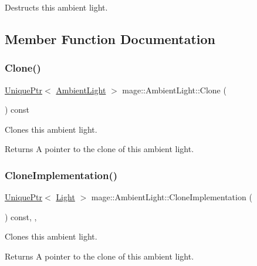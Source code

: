 Destructs this ambient light. 

\subsection{Member Function Documentation}
\hypertarget{classmage_1_1_ambient_light_a542a68882bc0807cf5f9a37391b9f44e}{}\label{classmage_1_1_ambient_light_a542a68882bc0807cf5f9a37391b9f44e} 
\subsubsection{\texorpdfstring{Clone()}{Clone()}}
{\footnotesize\ttfamily \hyperlink{namespacemage_a3316d7143a973e37adf1110f2e80ca31}{Unique\+Ptr}$<$ \hyperlink{classmage_1_1_ambient_light}{Ambient\+Light} $>$ mage\+::\+Ambient\+Light\+::\+Clone (\begin{DoxyParamCaption}{ }\end{DoxyParamCaption}) const}

Clones this ambient light.

\begin{DoxyReturn}{Returns}
A pointer to the clone of this ambient light. 
\end{DoxyReturn}
\hypertarget{classmage_1_1_ambient_light_a7223a4770653c20e662810b0956c6e51}{}\label{classmage_1_1_ambient_light_a7223a4770653c20e662810b0956c6e51} 
\subsubsection{\texorpdfstring{Clone\+Implementation()}{CloneImplementation()}}
{\footnotesize\ttfamily \hyperlink{namespacemage_a3316d7143a973e37adf1110f2e80ca31}{Unique\+Ptr}$<$ \hyperlink{classmage_1_1_light}{Light} $>$ mage\+::\+Ambient\+Light\+::\+Clone\+Implementation (\begin{DoxyParamCaption}{ }\end{DoxyParamCaption}) const\hspace{0.3cm}{\ttfamily [override]}, {\ttfamily [private]}, {\ttfamily [virtual]}}

Clones this ambient light.

\begin{DoxyReturn}{Returns}
A pointer to the clone of this ambient light. 
\end{DoxyReturn}


